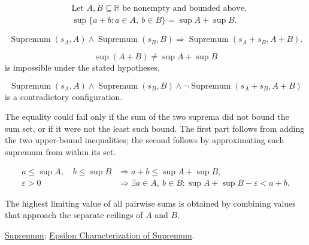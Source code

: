 \begin{remark*}
\[
\begin{aligned}
&\text{Let }A,B\subseteq\mathbb{R}\text{ be nonempty and bounded above.}\\
&\sup\{a+b:a\in A,\ b\in B\}=\sup A+\sup B.
\end{aligned}
\]
\end{remark*}

\begin{remark*}
\[
\operatorname{Supremum}(s_A,A)\land \operatorname{Supremum}(s_B,B)
\Longrightarrow
\operatorname{Supremum}(s_A+s_B,A+B).
\]
\end{remark*}

\begin{remark*}
\[
\sup(A+B)\ne \sup A+\sup B
\]
is impossible under the stated hypotheses.
\end{remark*}

\begin{remark*}
\[
\operatorname{Supremum}(s_A,A)\land \operatorname{Supremum}(s_B,B)
\land
\neg\operatorname{Supremum}(s_A+s_B,A+B)
\]
is a contradictory configuration.
\end{remark*}

\begin{remark*}
The equality could fail only if the sum of the two suprema did not bound the sum set, or if it were not the least such bound. The first part follows from adding the two upper-bound inequalities; the second follows by approximating each supremum from within its set.
\end{remark*}

\begin{remark*}
\[
\begin{aligned}
a\le \sup A,\quad b\le \sup B
&\Longrightarrow a+b\le \sup A+\sup B,\\
\varepsilon>0
&\Longrightarrow
\exists a\in A,\ b\in B:
\sup A+\sup B-\varepsilon<a+b.
\end{aligned}
\]
\end{remark*}

\begin{remark*}[Interpretation]
The highest limiting value of all pairwise sums is obtained by combining values that approach the separate ceilings of $A$ and $B$.
\end{remark*}

\begin{remark*}[Dependencies]
\hyperref[def:supremum]{Supremum};
\hyperref[def:epsilon-characterization-of-supremum]{Epsilon Characterization of Supremum}.
\end{remark*}























